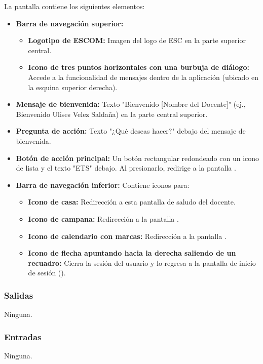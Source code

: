 La pantalla contiene los siguientes elementos:
\begin{itemize}
	\item \textbf{Barra de navegación superior:}
	\begin{itemize}
		\item \textbf{Logotipo de ESCOM:} Imagen del logo de ESC en la parte superior central.
		\item \textbf{Icono de tres puntos horizontales con una burbuja de diálogo:} Accede a la funcionalidad de mensajes dentro de la aplicación (ubicado en la esquina superior derecha).
	\end{itemize}
	\item \textbf{Mensaje de bienvenida:} Texto "Bienvenido [Nombre del Docente]" (ej., Bienvenido Ulises Velez Saldaña) en la parte central superior.
	\item \textbf{Pregunta de acción:} Texto "¿Qué deseas hacer?" debajo del mensaje de bienvenida.
	\item \textbf{Botón de acción principal:} Un botón rectangular redondeado con un icono de lista y el texto "ETS" debajo. Al presionarlo, redirige a la pantalla .
	\item \textbf{Barra de navegación inferior:} Contiene iconos para:
	\begin{itemize}
		\item \textbf{Icono de casa:} Redirección a esta pantalla de saludo del docente.
		\item \textbf{Icono de campana:} Redirección a la pantalla .
		\item \textbf{Icono de calendario con marcas:} Redirección a la pantalla .
		\item \textbf{Icono de flecha apuntando hacia la derecha saliendo de un recuadro:} Cierra la sesión del usuario y lo regresa a la pantalla de inicio de sesión ().
	\end{itemize}
\end{itemize}

\subsubsection{Salidas}
Ninguna.

\subsubsection{Entradas}
Ninguna.

